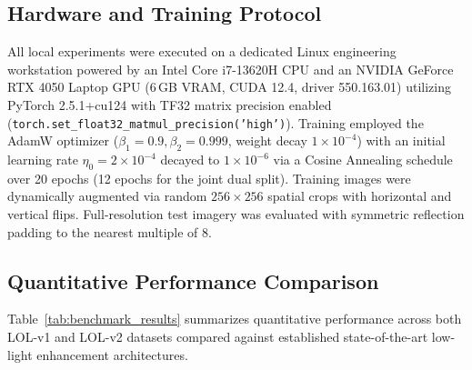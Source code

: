 \documentclass[10pt,twocolumn,letterpaper]{article}
\begin{document}
\subsection{Hardware and Training Protocol}
All local experiments were executed on a dedicated Linux engineering workstation powered by an Intel Core i7-13620H CPU and an NVIDIA GeForce RTX 4050 Laptop GPU (6\,GB VRAM, CUDA 12.4, driver 550.163.01) utilizing PyTorch 2.5.1+cu124 with TF32 matrix precision enabled (\texttt{torch.set\_float32\_matmul\_precision('high')}). Training employed the AdamW optimizer ($\beta_1 = 0.9, \beta_2 = 0.999$, weight decay $1\times 10^{-4}$) with an initial learning rate $\eta_0 = 2\times 10^{-4}$ decayed to $1\times 10^{-6}$ via a Cosine Annealing schedule over 20 epochs (12 epochs for the joint dual split). Training images were dynamically augmented via random $256 \times 256$ spatial crops with horizontal and vertical flips. Full-resolution test imagery was evaluated with symmetric reflection padding to the nearest multiple of 8.

\subsection{Quantitative Performance Comparison}
Table~\ref{tab:benchmark_results} summarizes quantitative performance across both LOL-v1 and LOL-v2 datasets compared against established state-of-the-art low-light enhancement architectures.
\end{document}
